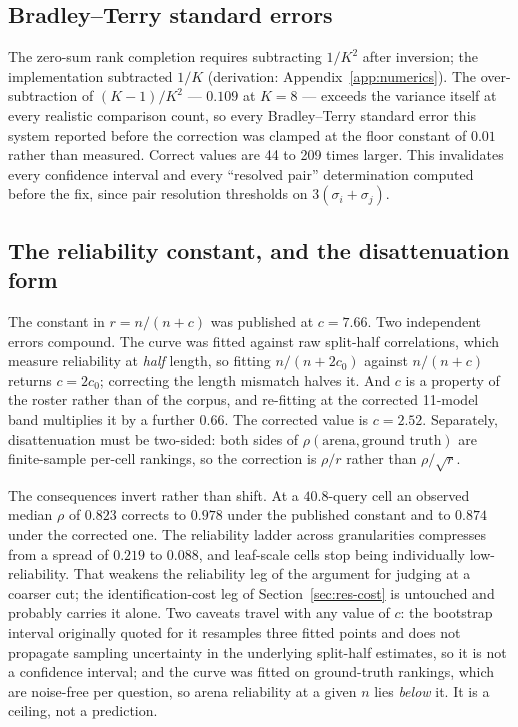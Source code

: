 \subsection*{Bradley--Terry standard errors}

The zero-sum rank completion requires subtracting $1/K^{2}$ after
inversion; the implementation subtracted $1/K$
(derivation: Appendix~\ref{app:numerics}). The over-subtraction of
$(K-1)/K^{2}$ --- $0.109$ at $K = 8$ --- exceeds the variance itself
at every realistic comparison count, so every Bradley--Terry standard
error this system reported before the correction was clamped at the
floor constant of $0.01$ rather than measured. Correct values are 44
to 209 times larger. This invalidates every confidence interval and
every ``resolved pair'' determination computed before the fix, since
pair resolution thresholds on $3(\sigma_i + \sigma_j)$.

\subsection*{The reliability constant, and the disattenuation form}

The constant in $r = n/(n+c)$ was published at $c = 7.66$. Two
independent errors compound. The curve was fitted against raw
split-half correlations, which measure reliability at \emph{half}
length, so fitting $n/(n + 2c_0)$ against $n/(n + c)$ returns
$c = 2c_0$; correcting the length mismatch halves it. And $c$ is a
property of the roster rather than of the corpus, and re-fitting at
the corrected 11-model band multiplies it by a further $0.66$. The
corrected value is $c = 2.52$. Separately, disattenuation must be
two-sided: both sides of $\rho(\text{arena}, \text{ground truth})$ are
finite-sample per-cell rankings, so the correction is $\rho / r$
rather than $\rho / \sqrt{r}$.

The consequences invert rather than shift. At a $40.8$-query cell an
observed median $\rho$ of $0.823$ corrects to $0.978$ under the
published constant and to $0.874$ under the corrected one. The
reliability ladder across granularities compresses from a spread of
$0.219$ to $0.088$, and leaf-scale cells stop being individually
low-reliability. That weakens the reliability leg of the argument for
judging at a coarser cut; the identification-cost leg of
Section~\ref{sec:res-cost} is untouched and probably carries it alone.
Two caveats travel with any value of $c$: the bootstrap interval
originally quoted for it resamples three fitted points and does not
propagate sampling uncertainty in the underlying split-half estimates,
so it is not a confidence interval; and the curve was fitted on
ground-truth rankings, which are noise-free per question, so arena
reliability at a given $n$ lies \emph{below} it. It is a ceiling, not
a prediction.

